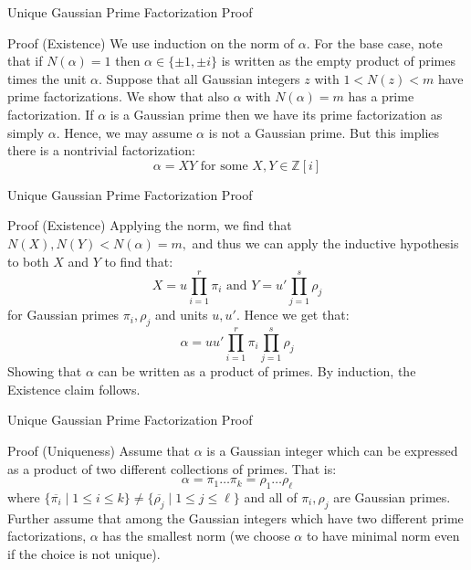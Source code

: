 \begin{frame}{Unique Gaussian Prime Factorization Proof}
    \begin{block}{Proof (Existence)}
We use induction on the norm of $\alpha.$ For the base case, note that if $N(\alpha)=1$ then $\alpha\in\{\pm 1,\pm i\}$ is written as the empty product of primes times the unit $\alpha.$ Suppose that all Gaussian integers $z$ with $1<N(z)<m$ have prime factorizations. We show that also $\alpha$ with $N(\alpha)=m$ has a prime factorization. If $\alpha$ is a Gaussian prime then we have its prime factorization as simply $\alpha.$ Hence, we may assume $\alpha$ is not a Gaussian prime. But this implies there is a nontrivial factorization:
$$\alpha = XY \text{ for some } X,Y\in\mathbb{Z}[i]$$
\end{block}
\end{frame}

\begin{frame}{Unique Gaussian Prime Factorization Proof}
\begin{block}{Proof (Existence)}
Applying the norm, we find that $N(X),N(Y)<N(\alpha)=m,$ and thus we can apply the inductive hypothesis to both $X$ and $Y$ to find that:
$$X=u\prod_{i=1}^{r}\pi_i \text{   and      }Y=u'\prod_{j=1}^{s}\rho_j$$
for Gaussian primes $\pi_i, \rho_j$ and units $u,u'.$ Hence we get that:
$$\alpha=uu'\prod_{i=1}^{r}\pi_i\prod_{j=1}^{s}\rho_j$$
Showing that $\alpha$ can be written as a product of primes. By induction, the Existence claim follows. \\
    \end{block}
\end{frame}



\begin{frame}{Unique Gaussian Prime Factorization Proof}
    \begin{block}{Proof (Uniqueness)}
    Assume that $\alpha$ is a Gaussian integer which can be expressed as a product of two different collections of primes. That is:
$$\alpha =\pi_1\ldots\pi_k=\rho_1\ldots\rho_\ell$$
where $\{\overline{\pi_i}\mid 1\leq i\leq k\}\neq\{\overline{\rho_j} \mid 1\leq j\leq \ell\}$ and all of $\pi_i,\rho_j$ are Gaussian primes. Further assume that among the Gaussian integers which have two different prime factorizations, $\alpha$ has the smallest norm (we choose $\alpha$ to have minimal norm even if the choice is not unique). 
\end{block}
\end{frame}



